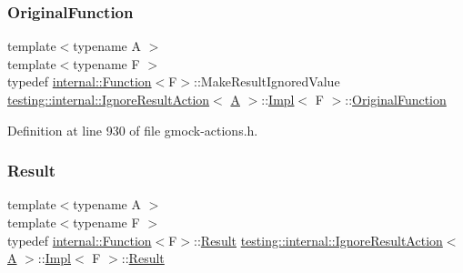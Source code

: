 \mbox{\label{classtesting_1_1internal_1_1IgnoreResultAction_1_1Impl_a00db745de37ebae1ee631240098bc2b1}} 
\subsubsection{\texorpdfstring{Original\+Function}{OriginalFunction}}
{\footnotesize\ttfamily template$<$typename A $>$ \\
template$<$typename F $>$ \\
typedef \hyperlink{structtesting_1_1internal_1_1Function}{internal\+::\+Function}$<$F$>$\+::Make\+Result\+Ignored\+Value \hyperlink{classtesting_1_1internal_1_1IgnoreResultAction}{testing\+::internal\+::\+Ignore\+Result\+Action}$<$ \hyperlink{namespacetesting_a5e9134d655d2fc9323902348083282e7}{A} $>$\+::\hyperlink{classtesting_1_1internal_1_1IgnoreResultAction_1_1Impl}{Impl}$<$ F $>$\+::\hyperlink{classtesting_1_1internal_1_1IgnoreResultAction_1_1Impl_a00db745de37ebae1ee631240098bc2b1}{Original\+Function}\hspace{0.3cm}{\ttfamily [private]}}



Definition at line 930 of file gmock-\/actions.\+h.

\mbox{\label{classtesting_1_1internal_1_1IgnoreResultAction_1_1Impl_a5848be04a86b1149840d04eca6e0bc80}} 
\subsubsection{\texorpdfstring{Result}{Result}}
{\footnotesize\ttfamily template$<$typename A $>$ \\
template$<$typename F $>$ \\
typedef \hyperlink{structtesting_1_1internal_1_1Function}{internal\+::\+Function}$<$F$>$\+::\hyperlink{classtesting_1_1ActionInterface_a7477de2fe3e4e01c59db698203acaee7}{Result} \hyperlink{classtesting_1_1internal_1_1IgnoreResultAction}{testing\+::internal\+::\+Ignore\+Result\+Action}$<$ \hyperlink{namespacetesting_a5e9134d655d2fc9323902348083282e7}{A} $>$\+::\hyperlink{classtesting_1_1internal_1_1IgnoreResultAction_1_1Impl}{Impl}$<$ F $>$\+::\hyperlink{classtesting_1_1ActionInterface_a7477de2fe3e4e01c59db698203acaee7}{Result}}



